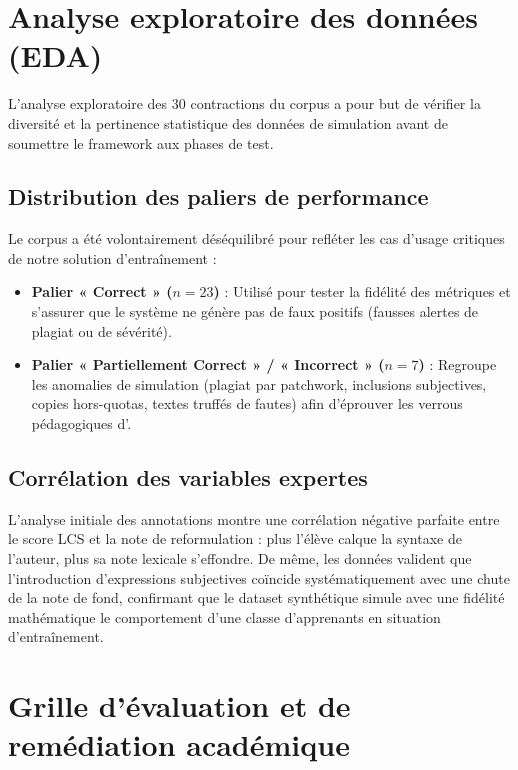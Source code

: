 \section{Analyse exploratoire des données (EDA)}

L'analyse exploratoire des 30 contractions du corpus a pour but de vérifier la diversité et la pertinence statistique des données de simulation avant de soumettre le framework aux phases de test.

\subsection{Distribution des paliers de performance}

Le corpus a été volontairement déséquilibré pour refléter les cas d'usage critiques de notre solution d'entraînement :

\begin{itemize}
    \item \textbf{Palier « Correct » (\(n=23\))} : Utilisé pour tester la fidélité des métriques et s'assurer que le système ne génère pas de faux positifs (fausses alertes de plagiat ou de sévérité).
    \item \textbf{Palier « Partiellement Correct » / « Incorrect » (\(n=7\))} : Regroupe les anomalies de simulation (plagiat par patchwork, inclusions subjectives, copies hors-quotas, textes truffés de fautes) afin d'éprouver les verrous pédagogiques d'\AZIZA.
\end{itemize}

\subsection{Corrélation des variables expertes}

L'analyse initiale des annotations montre une corrélation négative parfaite entre le score LCS et la note de reformulation : plus l'élève calque la syntaxe de l'auteur, plus sa note lexicale s'effondre. De même, les données valident que l'introduction d'expressions subjectives coïncide systématiquement avec une chute de la note de fond, confirmant que le dataset synthétique simule avec une fidélité mathématique le comportement d'une classe d'apprenants en situation d'entraînement.

\section{Grille d'évaluation et de remédiation académique}
\label{sec:grille}

